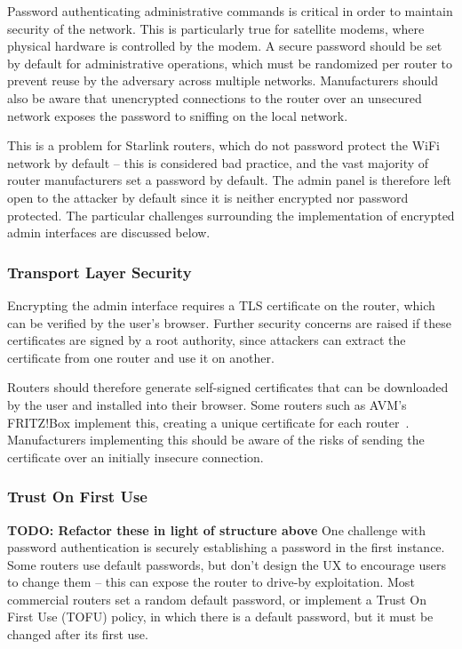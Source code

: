 Password authenticating administrative commands is critical in order to maintain security of the network.
This is particularly true for satellite modems, where physical hardware is controlled by the modem.
A secure password should be set by default for administrative operations, which must be randomized per router to prevent reuse by the adversary across multiple networks.
Manufacturers should also be aware that unencrypted connections to the router over an unsecured network exposes the password to sniffing on the local network.

This is a problem for Starlink routers, which do not password protect the WiFi network by default -- this is considered bad practice, and the vast majority of router manufacturers set a password by default.
The admin panel is therefore left open to the attacker by default since it is neither encrypted nor password protected.
The particular challenges surrounding the implementation of encrypted admin interfaces are discussed below.

\subsubsection{Transport Layer Security}

Encrypting the admin interface requires a TLS certificate on the router, which can be verified by the user's browser.
Further security concerns are raised if these certificates are signed by a root authority, since attackers can extract the certificate from one router and use it on another.

Routers should therefore generate self-signed certificates that can be downloaded by the user and installed into their browser.
Some routers such as AVM's FRITZ!Box implement this, creating a unique certificate for each router~\cite{fritzbox_cert}.
Manufacturers implementing this should be aware of the risks of sending the certificate over an initially insecure connection.

\subsubsection{Trust On First Use}

\textbf{TODO: Refactor these in light of structure above}
One challenge with password authentication is securely establishing a password in the first instance.
Some routers use default passwords, but don't design the UX to encourage users to change them -- this can expose the router to drive-by exploitation.
Most commercial routers set a random default password, or implement a Trust On First Use (TOFU) policy, in which there is a default password, but it must be changed after its first use.

